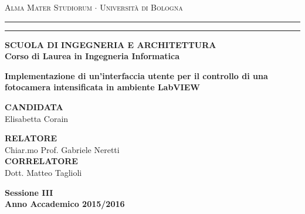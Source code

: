 \thispagestyle{empty}
\textwidth=450pt\oddsidemargin=0pt
\begin{titlepage}
\begin{center}
{{\Large{\textsc{Alma Mater Studiorum $\cdot$ Universit\`a di
Bologna}}}} \rule[0.1cm]{15.8cm}{0.1mm}
\rule[0.5cm]{15.8cm}{0.6mm}
{\small{\bf SCUOLA DI INGEGNERIA E ARCHITETTURA\\
Corso di Laurea in Ingegneria Informatica }}
\end{center}
\vspace{15mm}
\begin{center}
{\LARGE{\bf Implementazione di un'interfaccia utente per il controllo di una fotocamera intensificata in ambiente LabVIEW}}\\
\vspace{3mm}
\end{center}
\vspace{40mm}
\par
\noindent

 \begin{flushleft}
  \textbf{CANDIDATA}\\ Elisabetta Corain \\
\end{flushleft}

\vspace*{-2cm}

 \begin{flushright}
  \textbf{RELATORE}\\ Chiar.mo Prof. Gabriele Neretti \\
  \vspace*{1.5cm}
  \textbf{CORRELATORE}\\ Dott. Matteo Taglioli
 \end{flushright}

\vspace{20mm}
\begin{center}
{\large{\bf Sessione III\\
Anno Accademico 2015/2016}}
\end{center}
\end{titlepage}